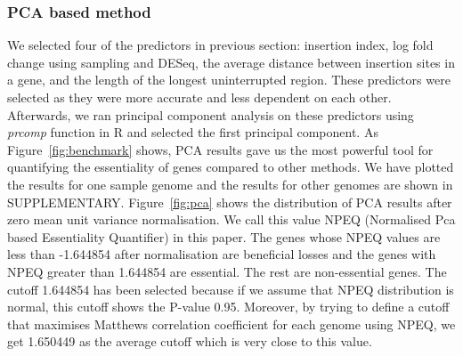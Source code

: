 \documentclass[12pt,letterpaper]{article}
\begin{document}
\subsubsection{PCA based method}\label{sec:essentiality-call}
We selected four of the predictors in previous section: insertion index, log fold change using sampling and DESeq, the average distance between insertion sites in a gene, and the length of the longest uninterrupted region. These predictors were selected as they were more accurate and less dependent on each other. Afterwards, we ran principal component analysis on these predictors using \emph{prcomp} function in R and selected the first principal component. As Figure~\ref{fig:benchmark} shows, PCA results gave us the most powerful tool for quantifying the essentiality of genes compared to other methods. We have plotted the results for one sample genome and the results for other genomes are shown in {\color{red}SUPPLEMENTARY}. Figure~\ref{fig:pca} shows the distribution of PCA results after zero mean unit variance normalisation. We call this value NPEQ (Normalised Pca based Essentiality Quantifier) in this paper. The genes whose NPEQ values are less than -1.644854 after normalisation are beneficial losses and the genes with NPEQ greater than 1.644854 are essential. The rest are non-essential genes. The cutoff 1.644854 has been selected because if we assume that NPEQ distribution is normal, this cutoff shows the P-value 0.95. Moreover, by trying to define a cutoff that maximises Matthews correlation coefficient for each genome using NPEQ, we get 1.650449 as the average cutoff which is very close to this value.
\end{document}
